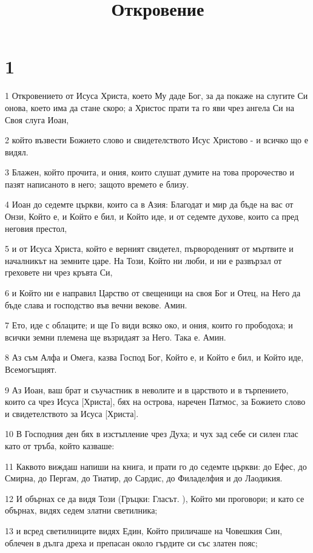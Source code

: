 

\title{Откровение}


\chapter{1}

\par 1 Откровението от Исуса Христа, което Му даде Бог, за да покаже на слугите Си онова, което има да стане скоро; а Христос прати та го яви чрез ангела Си на Своя слуга Иоан,
\par 2 който възвести Божието слово и свидетелството Исус Христово - и всичко що е видял.
\par 3 Блажен, който прочита, и ония, които слушат думите на това пророчество и пазят написаното в него; защото времето е близу.
\par 4 Иоан до седемте църкви, които са в Азия: Благодат и мир да бъде на вас от Онзи, Който е, и Който е бил, и Който иде, и от седемте духове, които са пред неговия престол,
\par 5 и от Исуса Христа, който е верният свидетел, първороденият от мъртвите и началникът на земните царе. На Този, Който ни люби, и ни е развързал от греховете ни чрез кръвта Си,
\par 6 и Който ни е направил Царство от свещеници на своя Бог и Отец, на Него да бъде слава и господство във вечни векове. Амин.
\par 7 Ето, иде с облаците; и ще Го види всяко око, и ония, които го прободоха; и всички земни племена ще възридаят за Него. Така е. Амин.
\par 8 Аз съм Алфа и Омега, казва Господ Бог, Който е, и Който е бил, и Който иде, Всемогъщият.
\par 9 Аз Иоан, ваш брат и съучастник в неволите и в царството и в търпението, които са чрез Исуса [Христа], бях на острова, наречен Патмос, за Божието слово и свидетелството за Исуса [Христа].
\par 10 В Господния ден бях в изстъпление чрез Духа; и чух зад себе си силен глас като от тръба, който казваше:
\par 11 Каквото виждаш напиши на книга, и прати го до седемте църкви: до Ефес, до Смирна, до Пергам, до Тиатир, до Сардис, до Филаделфия и до Лаодикия.
\par 12 И обърнах се да видя Този (Гръцки: Гласът. ), Който ми проговори; и като се обърнах, видях седем златни светилника;
\par 13 и всред светилниците видях Един, Който приличаше на Човешкия Син, облечен в дълга дреха и препасан около гърдите си със златен пояс;
